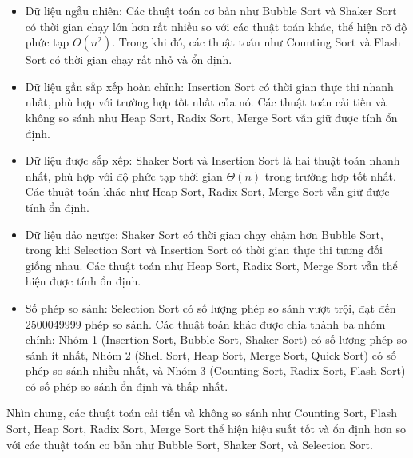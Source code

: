 \begin{itemize}
    \item Dữ liệu ngẫu nhiên: Các thuật toán cơ bản như Bubble Sort và Shaker Sort có thời gian chạy lớn hơn rất nhiều so với các thuật toán khác, thể hiện rõ độ phức tạp $O(n^2)$. Trong khi đó, các thuật toán như Counting Sort và Flash Sort có thời gian chạy rất nhỏ và ổn định.
    \item Dữ liệu gần sắp xếp hoàn chỉnh: Insertion Sort có thời gian thực thi nhanh nhất, phù hợp với trường hợp tốt nhất của nó. Các thuật toán cải tiến và không so sánh như Heap Sort, Radix Sort, Merge Sort vẫn giữ được tính ổn định.
    \item Dữ liệu được sắp xếp: Shaker Sort và Insertion Sort là hai thuật toán nhanh nhất, phù hợp với độ phức tạp thời gian $\Theta(n)$ trong trường hợp tốt nhất. Các thuật toán khác như Heap Sort, Radix Sort, Merge Sort vẫn giữ được tính ổn định.
    \item Dữ liệu đảo ngược: Shaker Sort có thời gian chạy chậm hơn Bubble Sort, trong khi Selection Sort và Insertion Sort có thời gian thực thi tương đối giống nhau. Các thuật toán như Heap Sort, Radix Sort, Merge Sort vẫn thể hiện được tính ổn định.
    \item Số phép so sánh: Selection Sort có số lượng phép so sánh vượt trội, đạt đến 2500049999 phép so sánh. Các thuật toán khác được chia thành ba nhóm chính: Nhóm 1 (Insertion Sort, Bubble Sort, Shaker Sort) có số lượng phép so sánh ít nhất, Nhóm 2 (Shell Sort, Heap Sort, Merge Sort, Quick Sort) có số phép so sánh nhiều nhất, và Nhóm 3 (Counting Sort, Radix Sort, Flash Sort) có số phép so sánh ổn định và thấp nhất.
\end{itemize}

Nhìn chung, các thuật toán cải tiến và không so sánh như Counting Sort, Flash Sort, Heap Sort, Radix Sort, Merge Sort thể hiện hiệu suất tốt và ổn định hơn so với các thuật toán cơ bản như Bubble Sort, Shaker Sort, và Selection Sort.